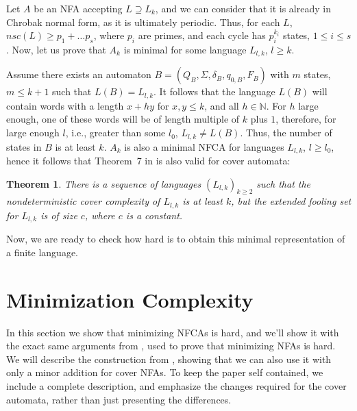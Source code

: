 \documentclass[submission,copyright,creativecommons]{eptcs}
\newcommand{\N}{{\mathbb N}}
\newtheorem{theorem}{Theorem}
\begin{document}
Let $A$ be an NFA accepting $L\supseteq L_k$, and we can consider that it is already in Chrobak normal form, 
as it is ultimately periodic.
Thus, for each $L$, $nsc(L)\geq p_1+\ldots p_s$, where $p_i$ are primes, and each cycle has $p_i^{k_i}$ states, 
$1\leq i\leq s$. 
Now, let us prove that $A_k$ is minimal for some language $L_{l,k}$, $l\geq k$.


Assume there exists an automaton $B=(Q_B,\Sigma,\delta_B,q_{0,B},F_B)$ with $m$ states, $m\leq k+1$ such that
 $L(B)=L_{l,k}$.
It follows that the language $L(B)$ will contain words 
with a length $x+hy$ for $x,y\leq k$, and all $h\in \N$. For $h$ large enough, one of these words will be 
of length multiple of $k$ plus $1$, therefore, for large enough $l$, i.e., greater than some $l_0$,
$L_{l,k}\neq L(B)$. Thus, the number of states in $B$ is at least $k$.
$A_k$ is also a minimal NFCA for languages $L_{l,k}$, $l\geq l_0$, hence it follows that Theorem~7 in 
\cite{GruberHolzerNFAHard} is also valid for cover automata:

\begin{theorem}
 There is a sequence of languages $(L_{l,k})_{k\geq 2}$ such that the nondeterministic cover complexity
of $L_{l,k}$ is at least $k$, but the extended fooling set for $L_{l,k}$ is of size $c$,
 where $c$ is a constant.
\end{theorem}

Now, we are ready to check how hard is to obtain this minimal representation
of a finite language.


\section{Minimization Complexity}
\label{shard}

In this section we show that minimizing NFCAs is hard, and we'll show it with the exact same arguments from \cite{gruberholzerunary},
used to prove that minimizing NFAs is hard.
We will describe the construction from \cite{gramlich,gruberholzerunary}, showing 
that we can also use it with only a minor addition for cover NFAs.
To keep the paper self contained, we include a complete description,  
and emphasize the changes required for the cover automata, rather 
than just presenting the differences. 
\end{document}
